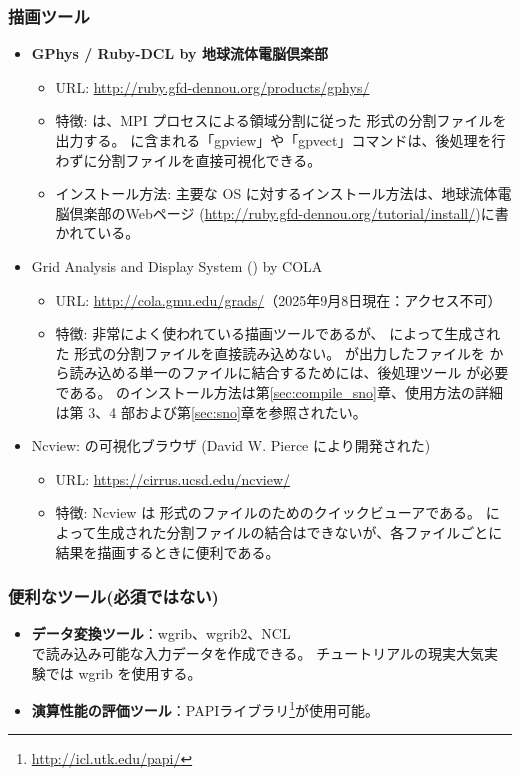 \subsubsection{\bf 描画ツール}
\begin{itemize}
  \item {\bf GPhys / Ruby-DCL by 地球流体電脳倶楽部}
  \begin{itemize}
    \item URL: \url{http://ruby.gfd-dennou.org/products/gphys/}
    \item 特徴: {\scalelib}は、MPI プロセスによる領域分割に従った {\netcdf} 形式の分割ファイルを出力する。
    {\gphys}に含まれる「gpview」や「gpvect」コマンドは、後処理を行わずに分割ファイルを直接可視化できる。
    \item インストール方法: 主要な OS に対するインストール方法は、地球流体電脳倶楽部のWebページ
    (\url{http://ruby.gfd-dennou.org/tutorial/install/})に書かれている。
  \end{itemize}
  \item Grid Analysis and Display System ({\grads}) by COLA
  \begin{itemize}
    \item URL: \url{http://cola.gmu.edu/grads/}（2025年9月8日現在：アクセス不可）
    \item 特徴: 非常によく使われている描画ツールであるが、 \scalelib によって生成された {\netcdf}形式の分割ファイルを直接読み込めない。
    \scalelib が出力したファイルを {\grads} から読み込める単一のファイルに結合するためには、後処理ツール \sno が必要である。
    \sno のインストール方法は第\ref{sec:compile_sno}章、使用方法の詳細は第 3、4 部および第\ref{sec:sno}章を参照されたい。
 \end{itemize}
 \item Ncview: {\netcdf} の可視化ブラウザ (David W. Pierce により開発された)
  \begin{itemize}
  \item URL: \url{https://cirrus.ucsd.edu/ncview/}
  \item 特徴: Ncview は {\netcdf}形式のファイルのためのクイックビューアである。
  \scalelib によって生成された分割ファイルの結合はできないが、各ファイルごとに結果を描画するときに便利である。
 \end{itemize}
\end{itemize}

\subsubsection{\bf 便利なツール(必須ではない)}
\begin{itemize}
  \item {\bf データ変換ツール}：wgrib、wgrib2、NCL \\
  \scalerm で読み込み可能な入力データを作成できる。
  チュートリアルの現実大気実験では wgrib を使用する。
  \item {\bf 演算性能の評価ツール}：PAPIライブラリ\footnote{\url{http://icl.utk.edu/papi/}}が使用可能。
\end{itemize}
